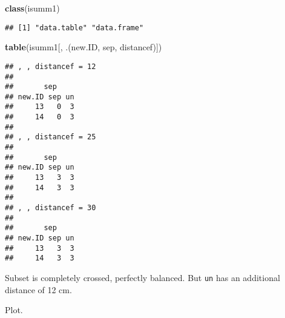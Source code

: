 \documentclass[
]{article}
\newenvironment{Shaded}{\begin{snugshade}}{\end{snugshade}}
\newcommand{\FunctionTok}[1]{\textcolor[rgb]{0.13,0.29,0.53}{\textbf{#1}}}
\newcommand{\NormalTok}[1]{#1}
\newcommand{\SpecialCharTok}[1]{\textcolor[rgb]{0.81,0.36,0.00}{\textbf{#1}}}
\newcommand{\StringTok}[1]{\textcolor[rgb]{0.31,0.60,0.02}{#1}}
\begin{document}
\begin{Shaded}
\begin{Highlighting}[]
\FunctionTok{class}\NormalTok{(isumm1)}
\end{Highlighting}
\end{Shaded}

\begin{verbatim}
## [1] "data.table" "data.frame"
\end{verbatim}

\begin{Shaded}
\end{Shaded}

\begin{Shaded}
\begin{Highlighting}[]
\FunctionTok{table}\NormalTok{(isumm1[, .(new.ID, sep, distancef)]) }
\end{Highlighting}
\end{Shaded}

\begin{verbatim}
## , , distancef = 12
## 
##       sep
## new.ID sep un
##     13   0  3
##     14   0  3
## 
## , , distancef = 25
## 
##       sep
## new.ID sep un
##     13   3  3
##     14   3  3
## 
## , , distancef = 30
## 
##       sep
## new.ID sep un
##     13   3  3
##     14   3  3
\end{verbatim}

Subset is completely crossed, perfectly balanced. But \texttt{un} has an
additional distance of 12 cm.

Plot.
\end{document}
